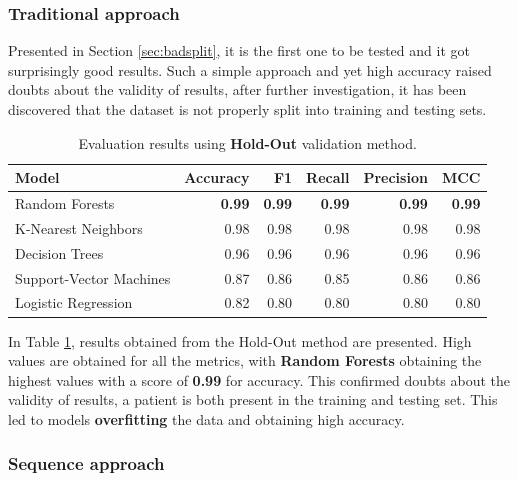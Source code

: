             \subsubsection{Traditional approach}
                
                Presented in Section \ref{sec:badsplit}, it is the first one to be tested and it got surprisingly good results. Such a simple approach and yet high accuracy raised doubts about the validity of results, after further investigation, it has been discovered that the dataset is not properly split into training and testing sets. 
            
                \begin{table}[htbp]
                    \centering
                    \caption{Evaluation results using \textbf{Hold-Out} validation method.}
                    \label{tab:wrong_approach_holdout}
                    \begin{tabular}{lrrrrr}
                        \toprule
                        \textbf{Model} & \textbf{Accuracy} & \textbf{F1} & \textbf{Recall} & \textbf{Precision} & \textbf{MCC} \\
                        \midrule
                        Random Forests & \textbf{0.99} & \textbf{0.99} & \textbf{0.99} & \textbf{0.99} & \textbf{0.99} \\
                        K-Nearest Neighbors & 0.98 & 0.98 & 0.98 & 0.98 & 0.98 \\
                        Decision Trees & 0.96 & 0.96 & 0.96 & 0.96 & 0.96 \\
                        Support-Vector Machines & 0.87 & 0.86 & 0.85 & 0.86 & 0.86 \\
                        Logistic Regression & 0.82 & 0.80 & 0.80 & 0.80 & 0.80 \\
                        \bottomrule
                    \end{tabular}
                \end{table}

                In Table \ref{tab:wrong_approach_holdout}, results obtained from the Hold-Out method are presented. High values are obtained for all the metrics, with \textbf{Random Forests} obtaining the highest values with a score of \textbf{0.99} for accuracy. This confirmed doubts about the validity of results, a patient is both present in the training and testing set. This led to models \textbf{overfitting} the data and obtaining high accuracy.

            \subsubsection{Sequence approach}

